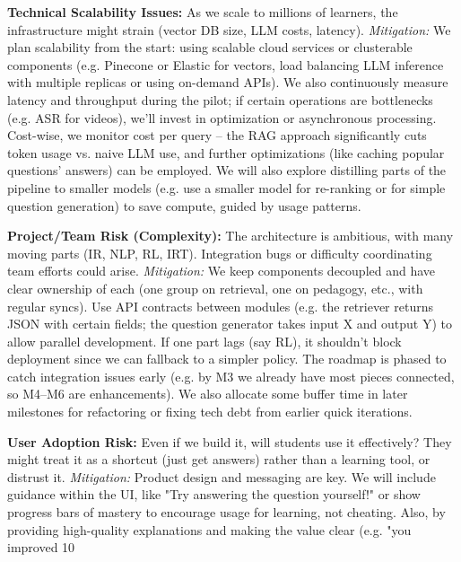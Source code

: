 \documentclass[11pt]{article}
\begin{document}
\textbf{Technical Scalability Issues:} As we scale to millions of learners, the infrastructure might strain (vector DB size, LLM costs, latency). \textit{Mitigation:} We plan scalability from the start: using scalable cloud services or clusterable components (e.g. Pinecone or Elastic for vectors, load balancing LLM inference with multiple replicas or using on-demand APIs). We also continuously measure latency and throughput during the pilot; if certain operations are bottlenecks (e.g. ASR for videos), we’ll invest in optimization or asynchronous processing. Cost-wise, we monitor cost per query – the RAG approach significantly cuts token usage vs. naive LLM use, and further optimizations (like caching popular questions’ answers) can be employed. We will also explore distilling parts of the pipeline to smaller models (e.g. use a smaller model for re-ranking or for simple question generation) to save compute, guided by usage patterns.

\textbf{Project/Team Risk (Complexity):} The architecture is ambitious, with many moving parts (IR, NLP, RL, IRT). Integration bugs or difficulty coordinating team efforts could arise. \textit{Mitigation:} We keep components decoupled and have clear ownership of each (one group on retrieval, one on pedagogy, etc., with regular syncs). Use API contracts between modules (e.g. the retriever returns JSON with certain fields; the question generator takes input X and output Y) to allow parallel development. If one part lags (say RL), it shouldn’t block deployment since we can fallback to a simpler policy. The roadmap is phased to catch integration issues early (e.g. by M3 we already have most pieces connected, so M4–M6 are enhancements). We also allocate some buffer time in later milestones for refactoring or fixing tech debt from earlier quick iterations.

\textbf{User Adoption Risk:} Even if we build it, will students use it effectively? They might treat it as a shortcut (just get answers) rather than a learning tool, or distrust it. \textit{Mitigation:} Product design and messaging are key. We will include guidance within the UI, like "Try answering the question yourself!" or show progress bars of mastery to encourage usage for learning, not cheating. Also, by providing high-quality explanations and making the value clear (e.g. "you improved 10%
\end{document}
